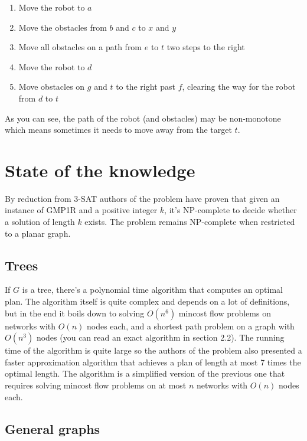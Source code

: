 \documentclass[12pt, a4paper]{article}
\theoremstyle{definition}
\begin{document}
\begin{enumerate}
    \item Move the robot to $a$
    \item Move the obstacles from $b$ and $c$ to $x$ and $y$
    \item Move all obstacles on a path from $e$ to $t$ two steps to the right
    \item Move the robot to $d$
    \item Move obstacles on $g$ and $t$ to the right past $f$, clearing the way for the robot from $d$ to $t$
\end{enumerate}

As you can see, the path of the robot (and obstacles) may be non-monotone which means sometimes it needs to move away from the target $t$.

\section*{State of the knowledge}

By reduction from 3-SAT authors of the problem \cite{365740} have proven that given an instance of GMP1R and a positive integer $k$, it’s NP-complete to decide whether a solution of length $k$ exists.
The problem remains NP-complete when restricted to a planar graph.

\subsection*{Trees}

If $G$ is a tree, there’s a polynomial time algorithm that computes an optimal plan.
The algorithm itself is quite complex and depends on a lot of definitions, but in the end it boils down to solving $O(n^6)$ mincost flow problems on networks with $O(n)$ nodes each, and a shortest path problem on a graph with $O(n^3)$ nodes (you can read an exact algorithm in \cite{365740} section 2.2). The running time of the algorithm is quite large so the authors of
the problem also presented a faster approximation algorithm that achieves a plan of length at most 7 times the optimal length.
The algorithm is a simplified version of the previous one that requires solving mincost flow problems on at most $n$ networks with
$O(n)$ nodes each.

\subsection*{General graphs}
\end{document}
